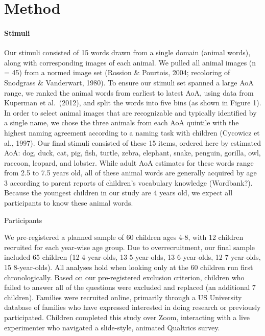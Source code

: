 \documentclass[10pt, letterpaper]{article}
\begin{document}
\hypertarget{method}{%
\section{Method}\label{method}}

\hypertarget{stimuli}{%
\paragraph{Stimuli}\label{stimuli}}

Our stimuli consisted of 15 words drawn from a single domain (animal
words), along with corresponding images of each animal. We pulled all
animal images (n = 45) from a normed image set (Rossion \& Pourtois,
2004; recoloring of Snodgrass \& Vanderwart, 1980). To ensure our
stimuli set spanned a large AoA range, we ranked the animal words from
earliest to latest AoA, using data from Kuperman et al.~(2012), and
split the words into five bins (as shown in Figure 1). In order to
select animal images that are recognizable and typically identified by a
single name, we chose the three animals from each AoA quintile with the
highest naming agreement according to a naming task with children
(Cycowicz et al., 1997). Our final stimuli consisted of these 15 items,
ordered here by estimated AoA: dog, duck, cat, pig, fish, turtle, zebra,
elephant, snake, penguin, gorilla, owl, raccoon, leopard, and lobster.
While adult AoA estimates for these words range from 2.5 to 7.5 years
old, all of these animal words are generally acquired by age 3 according
to parent reports of children's vocabulary knowledge (Wordbank?).
Because the youngest children in our study are 4 years old, we expect
all participants to know these animal words.

Participants

We pre-registered a planned sample of 60 children ages 4-8, with 12
children recruited for each year-wise age group. Due to overrecruitment,
our final sample included 65 children (12 4-year-olds, 13 5-year-olds,
13 6-year-olds, 12 7-year-olds, 15 8-year-olds). All analyses hold when
looking only at the 60 children run first chronologically. Based on our
pre-registered exclusion criterion, children who failed to answer all of
the questions were excluded and replaced (an additional 7 children).
Families were recruited online, primarily through a US University
database of families who have expressed interested in doing research or
previously participated. Children completed this study over Zoom,
interacting with a live experimenter who navigated a slide-style,
animated Qualtrics survey.
\end{document}
